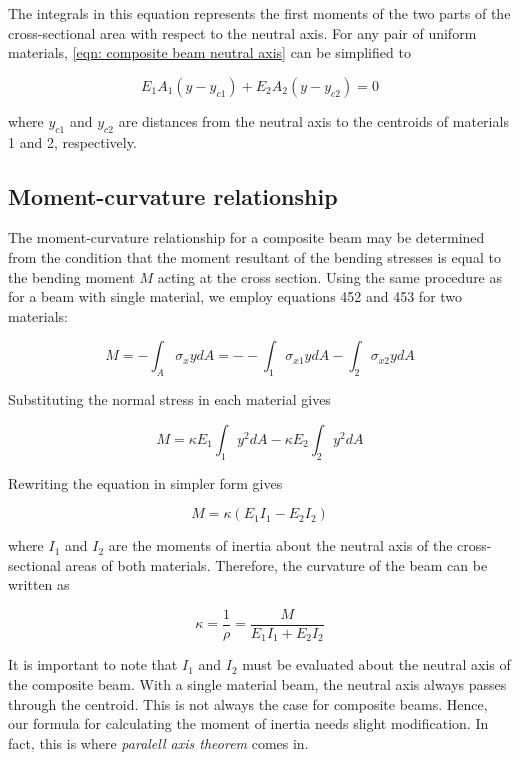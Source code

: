 \documentclass[
fontsize=10pt,
a4paper,
twosides=false,
open=any,
svgnames,
]{kaobook} %
\begin{document}
The integrals in this equation represents the first moments of the two parts of the cross-sectional area with respect to the neutral axis. For any pair of uniform materials, \cref{eqn: composite beam neutral axis} can be simplified to

\begin{equation}
  E_1A_1(y - y_{c1}) + E_2A_2(y - y_{c2}) = 0
\end{equation}

where $y_{c1}$ and $y_{c2}$ are distances from the neutral axis to the centroids of materials 1 and 2, respectively.

\subsection{Moment-curvature relationship}

The moment-curvature relationship for a composite beam may be determined from the condition that the moment resultant of the bending stresses is equal to the bending moment $M$ acting at the cross section. Using the same procedure as for a beam with single material, we employ equations 452 and 453 for two materials:

\[M =  - \int_A \sigma _xydA  =  -  - \int_1 \sigma _{x1}ydA  - \int_2 \sigma _{x2}ydA \]

Substituting the normal stress in each material gives

\[M = \kappa E_1\int_1 y^2dA  - \kappa E_2\int_2 y^2dA \]

Rewriting the equation in simpler form gives

\begin{equation}
  M = \kappa (E_1I_1 - E_2I_2)
\end{equation}

where $I_1$ and $I_2$ are the moments of inertia about the neutral axis of the cross-sectional areas of both materials. Therefore, the curvature of the beam can be written as

\begin{equation}
  \kappa  = \frac{1}{\rho } = \frac{M}{E_1I_1 + E_2I_2}
\end{equation}

It is important to note that $I_1$ and $I_2$ must be evaluated about the neutral axis of the composite beam. With a single material beam, the neutral axis always passes through the centroid. This is not always the case for composite beams. Hence, our formula for calculating the moment of inertia needs slight modification. In fact, this is where \emph{paralell axis theorem} comes in.
\end{document}
